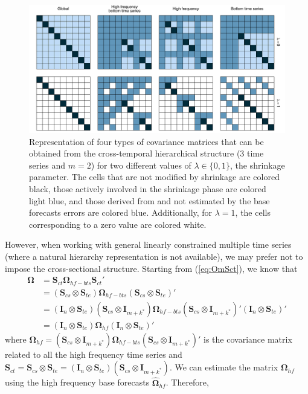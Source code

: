 \documentclass[a4paper,11pt]{article}
\newcommand{\Ivet}{\bm{I}}
\newcommand{\Svet}{\bm{S}}
\newcommand{\Omegavet}{\bm{\Omega}}
\theoremstyle{definition}
\begin{document}
\begin{figure}[t]
\centering
\includegraphics[width = \linewidth]{fig/shr_cov/shr_color.pdf}
\caption{Representation of four types of covariance matrices that can be obtained from the cross-temporal hierarchical structure ($3$ time series and $m = 2$) for two different values of $\lambda\in\{0,1\}$, the shrinkage parameter. The cells that are not modified by shrinkage are colored black, those actively involved in the shrinkage phase are colored light blue, and those derived from and not estimated by the base forecasts errors are colored blue. Additionally, for $\lambda = 1$, the cells corresponding to a zero value are colored white.}
\label{fig:shr_grid}
\end{figure}
However, when working with general linearly constrained multiple time series (where a natural hierarchy representation is not available), we may prefer not to impose the cross-sectional structure. Starting from (\ref{eq:OmSct}), we know that
\begin{align*}
	\Omegavet & = \Svet_{ct}\Omegavet_{hf-bts}\Svet_{ct}'\\
	 & = \left(\Svet_{cs} \otimes \Svet_{te}\right)\Omegavet_{hf-bts}\left(\Svet_{cs} \otimes \Svet_{te}\right)'\\
	 & = \left(\Ivet_n \otimes \Svet_{te}\right)\left(\Svet_{cs} \otimes \Ivet_{m+k^\ast}\right)\Omegavet_{hf-bts}\left(\Svet_{cs} \otimes \Ivet_{m+k^\ast}\right)'\left(\Ivet_n \otimes \Svet_{te}\right)'\\
	 & = \left(\Ivet_n \otimes \Svet_{te}\right)\Omegavet_{hf}\left(\Ivet_n \otimes \Svet_{te}\right)'
\end{align*}
where $\Omegavet_{hf} = \left(\Svet_{cs} \otimes \Ivet_{m+k^\ast}\right)\Omegavet_{hf-bts}\left(\Svet_{cs} \otimes \Ivet_{m+k^\ast}\right)'$ is the covariance matrix related to all the high frequency time series and $\Svet_{ct} = \Svet_{cs} \otimes \Svet_{te} = \left(\Ivet_n \otimes \Svet_{te}\right)\left(\Svet_{cs} \otimes \Ivet_{m+k^\ast}\right)$. We can estimate the matrix $\Omegavet_{hf}$ using the high frequency base forecasts $\widehat{\Omegavet}_{hf}$. Therefore, 
\end{document}
